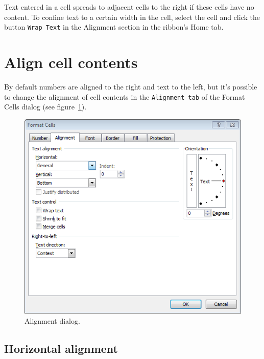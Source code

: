 Text entered in a cell spreads to adjacent cells to the right if these cells have no content. To confine text to a certain width in the cell, select the cell and click the button \texttt{Wrap Text} in the Alignment section in the ribbon's Home tab.

\section{Align cell contents}\hypertarget{align-cell-contents}{}\label{align-cell-contents}

By default numbers are aligned to the right and text to the left, but it's possible to change the alignment of cell
contents in the \texttt{Alignment tab} of the Format Cells dialog (see figure~\ref{img-alignment_dialog}).

\begin{figure}[htbp]
\begin{center}
\includegraphics[scale=0.7]{../img/alignment_dialog.png}
\end{center}
\caption{Alignment dialog.}
\label{img-alignment_dialog}
\end{figure}

\subsection{Horizontal alignment}\hypertarget{horizontal-alignment}{}\label{horizontal-alignment}

